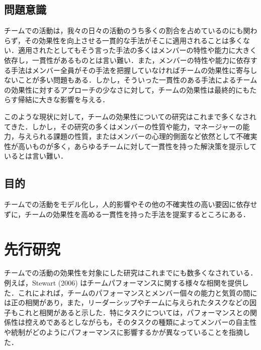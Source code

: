 \documentclass[a4paper, 11pt]{jsarticle}
\begin{document}
\subsection{問題意識}
チームでの活動は，我々の日々の活動のうち多くの割合を占めているのにも関わらず，その効果性を向上させる一貫的な手法がそこに適用されることは多くない．適用されたとしてもそう言った手法の多くはメンバーの特性や能力に大きく依存し，一貫性があるものとは言い難い．また，メンバーの特性や能力に依存する手法はメンバー全員がその手法を把握していなければチームの効果性に寄与しないことが多い問題もある．しかし，そういった一貫性のある手法によるチームの効果性に対するアプローチの少なさに対して，チームの効果性は最終的にもたらす帰結に大きな影響を与える．

このような現状に対して，チームの効果性についての研究はこれまで多くなされてきた．しかし，その研究の多くはメンバーの性質や能力，マネージャーの能力，与えられる課題の性質，またはメンバーの心理的側面など依然として不確実性が高いものが多く，あらゆるチームに対して一貫性を持った解決策を提示しているとは言い難い．
\subsection{目的}
チームでの活動をモデル化し，人的影響やその他の不確実性の高い要因に依存せずに，チームの効果性を高める一貫性を持った手法を提案するところにある．

\section{先行研究}
チームでの活動の効果性を対象にした研究はこれまでにも数多くなされている．例えば，Stewart (2006) \cite{Stewart}はチームパフォーマンスに関する様々な相関を提供した．これによれば，チームのパフォーマンスとメンバー個々の能力と気質の間には正の相関があり，また，リーダーシップやチームに与えられたタスクなどの因子もこれと相関があると示した．特にタスクについては，パフォーマンスとの関係性は控えめであるとしながらも，そのタスクの種類によってメンバーの自主性や統制がどのようにパフォーマンスに影響するかが異なっていることを指摘した．
\end{document}
